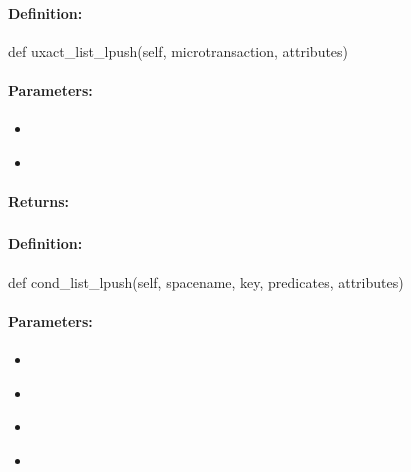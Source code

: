 \paragraph{Definition:}
\begin{pythoncode}
def uxact_list_lpush(self, microtransaction, attributes)
\end{pythoncode}

\paragraph{Parameters:}
\begin{itemize}[noitemsep]
\item {}\\

\item {}\\

\end{itemize}

\paragraph{Returns:}


\pagebreak
\subsubsection{}
\label{api:python:cond_list_lpush}


\paragraph{Definition:}
\begin{pythoncode}
def cond_list_lpush(self, spacename, key, predicates, attributes)
\end{pythoncode}

\paragraph{Parameters:}
\begin{itemize}[noitemsep]
\item {}\\

\item {}\\

\item {}\\

\item {}\\

\end{itemize}

